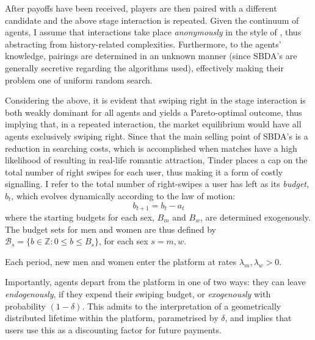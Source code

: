 After payoffs have been received, players are then paired with a different candidate and the above stage interaction is repeated. Given the continuum of agents, I assume that interactions take place \textit{anonymously} in the style of \cite{jovanovic1988anonymous}, thus abstracting from history-related complexities.
Furthermore, to the agents' knowledge, pairings are determined in an unknown manner (since SBDA's are generally secretive regarding the algorithms used), effectively making their problem one of uniform random search.

Considering the above, it is evident that swiping right in the stage interaction is both weakly dominant for all agents and yields a Pareto-optimal outcome, thus implying that, in a repeated interaction, the market equilibrium would have all agents exclusively swiping right. Since that the main selling point of SBDA's is a reduction in searching costs, which is accomplished when matches have a high likelihood of resulting in real-life romantic attraction, Tinder places a cap on the total number of right swipes for each user, thus making it a form of costly signalling. I refer to the total number of right-swipes a user has left as its \textit{budget}, $b_t$, which evolves dynamically according to the law of motion:
$$
  b_{t+1}= b_{t}- a_{t}
$$
where the starting budgets for each sex, $B_m$ and $B_w$, are determined exogenously. The budget sets for men and women are thus defined by $\mathcal{B}_{s}=\{b \in \mathbb{Z} : 0\leq b \leq B_s\}$, for each sex $s=m,w$. 

Each period, new men and women enter the platform at rates $\lambda_m, \lambda_w>0$.
\begin{comment}
    , with their attractiveness drawn i.i.d from distributions with cumulative distribution functions $F_m$ and $F_w$, respectively
\end{comment}
Importantly, agents depart from the platform in one of two ways: they can leave \textit{endogenously}, if they expend their swiping budget, or \textit{exogenously} with probability $(1-\delta)$. This admits to the interpretation of a geometrically distributed lifetime within the platform, parametrised by $\delta$, and implies that users use this as a discounting factor for future payments.

